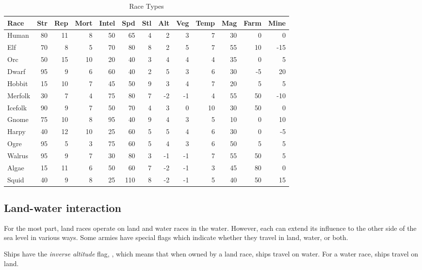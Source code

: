 \begin{same}
\begin{table}[hbpt]
\caption{Race Types}
\label{tab-races}
\begin{tabular}{ || l | r | r | r | r | r | r | r | r | r | r | r | r || }
\hline
Race    &Str&Rep&Mort&Intel&Spd&Stl&Alt&Veg&Temp&Mag&Farm&Mine\\
\hline
Human   & 80& 11&   8&   50& 65&  4&  2&  3&   7& 30&   0&   0\\
Elf     & 70&  8&   5&   70& 80&  8&  2&  5&   7& 55&  10& -15\\
Orc     & 50& 15&  10&   20& 40&  3&  4&  4&   4& 35&   0&   5\\
Dwarf   & 95&  9&   6&   60& 40&  2&  5&  3&   6& 30&  -5&  20\\
Hobbit  & 15& 10&   7&   45& 50&  9&  3&  4&   7& 20&   5&   5\\
Merfolk & 30&  7&   4&   75& 80&  7& -2& -1&   4& 55&  50& -10\\
Icefolk & 90&  9&   7&   50& 70&  4&  3&  0&  10& 30&  50&   0\\
Gnome   & 75& 10&   8&   95& 40&  9&  4&  3&   5& 10&   0&  10\\
Harpy   & 40& 12&  10&   25& 60&  5&  5&  4&   6& 30&   0&  -5\\
Ogre    & 95&  5&   3&   75& 60&  5&  4&  3&   6& 50&   5&   5\\
Walrus  & 95&  9&   7&   30& 80&  3& -1& -1&   7& 55&  50&   5\\
Algae   & 15& 11&   6&   50& 60&  7& -2& -1&   3& 45&  80&   0\\
Squid   & 40&  9&   8&   25&110&  8& -2& -1&   5& 40&  50&  15\\
\hline
\end{tabular}
\end{table}
\end{same}

\subsection{Land-water interaction}
For the most part, land races operate on land and water races in the
water.  However, each can extend its influence to the other side of
the sea level in various ways.  Some armies have special flags which
indicate whether they travel in land, water, or both.

Ships have the {\em inverse altitude} flag, , which means that
when owned by a land race, ships travel on water.  For a water race,
ships travel on land.

